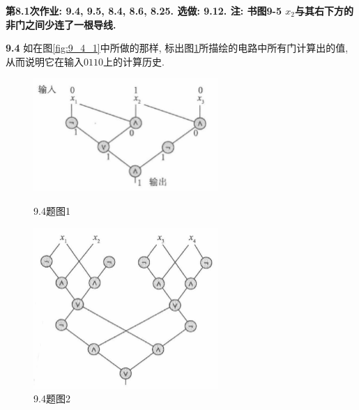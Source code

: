 \documentclass[UTF8]{report}
\newcommand{\problem}[1]{{\setlength{\parskip}{10pt}\noindent \bf{#1}}}
\begin{document}

\maketitle



\textbf{第8.1次作业: 9.4, 9.5, 8.4, 8.6, 8.25. 选做: 9.12. 注: 书图9-5 $x_2$与其右下方的非门之间少连了一根导线.}

\problem{9.4} 如在图\ref{fig:9_4_1}中所做的那样, 标出图\ref{fig:9_4_2}所描绘的电路中所有门计算出的值, 从而说明它在输入$0110$上的计算历史. 
\begin{figure}[!htbp]
    \begin{minipage}[t]{0.49\linewidth}
        \centering
        \includegraphics[width=7cm]{image/9.4.1.png}
        \caption{9.4题图1}
        \label{fig:9_4_1}
    \end{minipage}
    \begin{minipage}[t]{0.49\linewidth}
        \centering
        \includegraphics[width=7cm]{image/9.4.2.png}
        \caption{9.4题图2}
        \label{fig:9_4_2}
    \end{minipage}
\end{figure}
\end{document}
